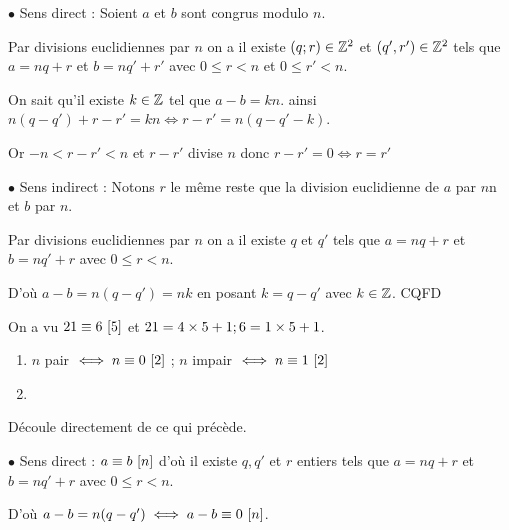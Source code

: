 \documentclass[10pt,a4paper]{article}
\begin{document}
$\bullet$ Sens direct : Soient $a$ et $b$ sont congrus modulo $n$.

Par divisions euclidiennes par $n$ on a il existe $(q;r) \in \mathbb{Z}^2$ et $(q',r') \in \mathbb{Z}^2$ tels que $a=nq+r$ et $b=nq'+r'$ avec $0 \leq r <n$ et $0 \leq r' <n$.

On sait qu'il existe $k \in \mathbb{Z}$ tel que $a-b=kn$. ainsi $n(q-q')+r-r'=kn \iff r-r'=n(q-q'-k)$.

Or $-n < r-r' <n$ et $r-r'$ divise $n$ donc $r-r'=0 \iff r=r'$

$\bullet$ Sens indirect : Notons $r$ le même reste que la division euclidienne de $a$ par $n$n et $b$ par $n$.

Par divisions euclidiennes par $n$ on a il existe $q$ et $q'$ tels que $a=nq+r$ et $b=nq'+r$ avec $0 \leq r <n$.

D'où $a-b=n(q-q')=nk$ en posant $k=q-q'$ avec $k \in \mathbb{Z}$. CQFD \medskip


\exe On a vu ${21} \equiv {6} ~ [{5}]$ et $21=4\times5+1;6=1\times5+1$. \medskip

\rems
\begin{enumerate}[$\bullet$]
\item $n$ pair $\iff {n} \equiv {0} ~ [{2}]$ ; $n$ impair $\iff {n} \equiv {1} ~ [{2}]$
\item {}
\end{enumerate}


\dem Découle directement de ce qui précède.



\dem 

$\bullet$ Sens direct : ${a} \equiv {b} ~ [{n}]$ d'où il existe $q,q'$ et $r$ entiers tels que $a=nq+r$ et $b=nq'+r$ avec $0 \leq r <n$.

D'où $a-b=n(q-q') \iff {a-b} \equiv {0} ~ [{n}]$.
\end{document}
